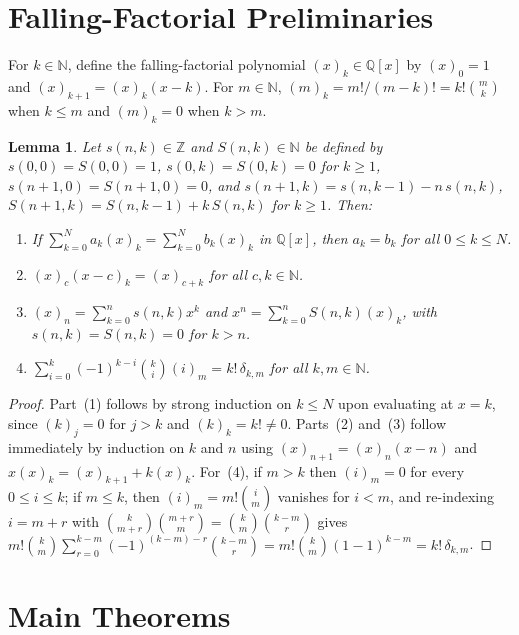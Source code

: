 \documentclass[11pt]{article}
\newtheorem{lemma}[theorem]{Lemma}
\begin{document}
\section{Falling-Factorial Preliminaries}

For $k \in \mathbb{N}$, define the falling-factorial polynomial $(x)_k \in \mathbb{Q}[x]$ by $(x)_0 = 1$ and $(x)_{k + 1} = (x)_k (x - k)$. For $m \in \mathbb{N}$, $(m)_k = m! / (m - k)! = k! \binom{m}{k}$ when $k \le m$ and $(m)_k = 0$ when $k > m$.

\begin{lemma}\label{lem:prelim}
Let $s(n, k) \in \mathbb{Z}$ and $S(n, k) \in \mathbb{N}$ be defined by $s(0, 0) = S(0, 0) = 1$, $s(0, k) = S(0, k) = 0$ for $k \ge 1$, $s(n + 1, 0) = S(n + 1, 0) = 0$, and $s(n + 1, k) = s(n, k - 1) - n\, s(n, k)$, $S(n + 1, k) = S(n, k - 1) + k\, S(n, k)$ for $k \ge 1$. Then:
\begin{enumerate}
  \item If $\sum_{k=0}^{N} a_k (x)_k = \sum_{k=0}^{N} b_k (x)_k$ in $\mathbb{Q}[x]$, then $a_k = b_k$ for all $0 \le k \le N$.
  \item $(x)_c (x - c)_k = (x)_{c + k}$ for all $c, k \in \mathbb{N}$.
  \item $(x)_n = \sum_{k=0}^{n} s(n, k) x^k$ and $x^n = \sum_{k=0}^{n} S(n, k) (x)_k$, with $s(n, k) = S(n, k) = 0$ for $k > n$.
  \item $\sum_{i=0}^{k} (-1)^{k - i} \binom{k}{i} (i)_m = k!\, \delta_{k, m}$ for all $k, m \in \mathbb{N}$.
\end{enumerate}
\end{lemma}

\begin{proof}
Part~(1) follows by strong induction on $k \le N$ upon evaluating at $x = k$, since $(k)_j = 0$ for $j > k$ and $(k)_k = k! \ne 0$. Parts~(2) and~(3) follow immediately by induction on $k$ and $n$ using $(x)_{n + 1} = (x)_n(x - n)$ and $x(x)_k = (x)_{k + 1} + k(x)_k$. For~(4), if $m > k$ then $(i)_m = 0$ for every $0 \le i \le k$; if $m \le k$, then $(i)_m = m!\binom{i}{m}$ vanishes for $i < m$, and re-indexing $i = m + r$ with $\binom{k}{m + r}\binom{m + r}{m} = \binom{k}{m}\binom{k - m}{r}$ gives $m!\binom{k}{m}\sum_{r=0}^{k-m}(-1)^{(k-m)-r}\binom{k-m}{r} = m!\binom{k}{m}(1 - 1)^{k - m} = k!\,\delta_{k, m}$.
\end{proof}

\section{Main Theorems}
\end{document}

